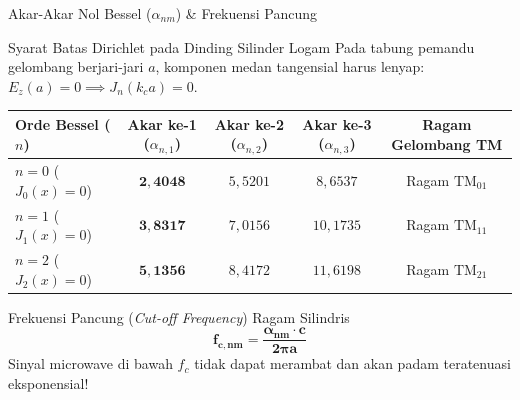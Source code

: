 \documentclass[aspectratio=169,10pt]{beamer}
\begin{document}
\begin{frame}{Akar-Akar Nol Bessel ($\alpha_{nm}$) \& Frekuensi Pancung}
  \begin{block}{Syarat Batas Dirichlet pada Dinding Silinder Logam}
    \small
    Pada tabung pemandu gelombang berjari-jari $a$, komponen medan tangensial harus lenyap: $E_z(a) = 0 \implies J_n(k_c a) = 0$.
  \end{block}
  \vspace{0.1cm}
  \begin{table}[h]
    \centering
    \scriptsize
    \begin{tabular}{lcccc}
      \toprule
      \textbf{Orde Bessel ($n$)} & \textbf{Akar ke-1 ($\alpha_{n,1}$)} & \textbf{Akar ke-2 ($\alpha_{n,2}$)} & \textbf{Akar ke-3 ($\alpha_{n,3}$)} & \textbf{Ragam Gelombang TM} \\
      \midrule
      $n = 0$ ($J_0(x) = 0$) & $\mathbf{2{,}4048}$ & $5{,}5201$ & $8{,}6537$ & Ragam $\text{TM}_{01}$ \\
      $n = 1$ ($J_1(x) = 0$) & $\mathbf{3{,}8317}$ & $7{,}0156$ & $10{,}1735$ & Ragam $\text{TM}_{11}$ \\
      $n = 2$ ($J_2(x) = 0$) & $\mathbf{5{,}1356}$ & $8{,}4172$ & $11{,}6198$ & Ragam $\text{TM}_{21}$ \\
      \bottomrule
    \end{tabular}
  \end{table}
  \begin{alertblock}{Frekuensi Pancung (\textit{Cut-off Frequency}) Ragam Silindris}
    \small
    \begin{equation*}
      \mathbf{f_{c,nm} = \frac{\alpha_{nm} \cdot c}{2\pi a}}
    \end{equation*}
    Sinyal microwave di bawah $f_c$ tidak dapat merambat dan akan padam teratenuasi eksponensial!
  \end{alertblock}
\end{frame}
\end{document}
